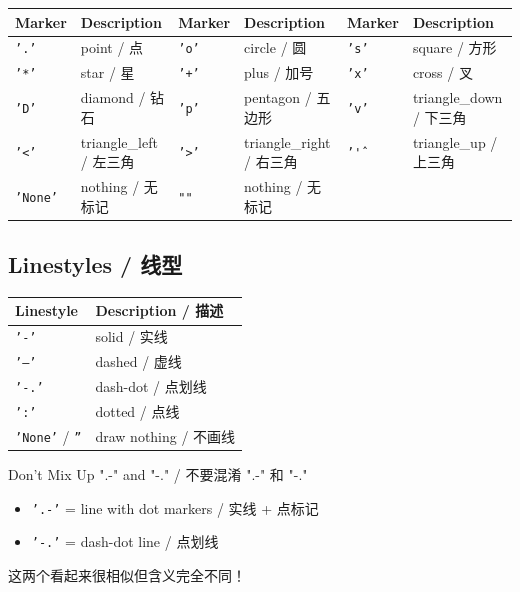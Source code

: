 \documentclass[11pt,a4paper]{report}
\let\oldtexttt\texttt
\renewcommand{\texttt}[1]{\textcolor{mainblue}{\oldtexttt{#1}}}
\begin{document}
\medskip
\centering
\small
\renewcommand{\arraystretch}{1.2}
\begin{tabular}{@{}llllll@{}}
\toprule
\textbf{Marker} & \textbf{Description} & \textbf{Marker} & \textbf{Description} & \textbf{Marker} & \textbf{Description} \\ \midrule
\texttt{'.'} & point / 点 & \texttt{'o'} & circle / 圆 & \texttt{'s'} & square / 方形 \\
\texttt{'*'} & star / 星 & \texttt{'+'} & plus / 加号 & \texttt{'x'} & cross / 叉 \\
\texttt{'D'} & diamond / 钻石 & \texttt{'p'} & pentagon / 五边形 & \texttt{'v'} & triangle\_down / 下三角 \\
\texttt{'<'} & triangle\_left / 左三角 & \texttt{'>'} & triangle\_right / 右三角 & \texttt{'\^'} & triangle\_up / 上三角 \\
\texttt{'None'} & nothing / 无标记 & \texttt{""} & nothing / 无标记 & & \\ \bottomrule
\end{tabular}
\medskip

\subsection{Linestyles / 线型}

\medskip
\centering
\renewcommand{\arraystretch}{1.3}
\begin{tabular}{@{}ll@{}}
\toprule
\textbf{Linestyle} & \textbf{Description / 描述} \\ \midrule
\texttt{'-'}  & solid / 实线 \\
\texttt{'--'} & dashed / 虚线 \\
\texttt{'-.'} & dash-dot / 点划线 \\
\texttt{':'}  & dotted / 点线 \\
\texttt{'None'} / \texttt{''} & draw nothing / 不画线 \\ \bottomrule
\end{tabular}
\medskip

\begin{warning}{Don't Mix Up ".-" and "-." / 不要混淆 ".-" 和 "-."}
    \begin{itemize}
        \item \texttt{'.-'} = line with dot markers / 实线 + 点标记
        \item \texttt{'-.'} = dash-dot line / 点划线
    \end{itemize}
    这两个看起来很相似但含义完全不同！
\end{warning}
\end{document}
